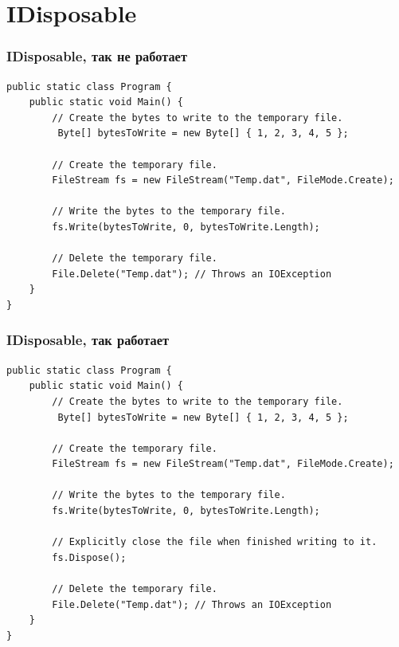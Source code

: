 \documentclass[xetex,mathserif,serif]{beamer}
\begin{document}
    \section{IDisposable}

    \begin{frame}[fragile]
        \frametitle{IDisposable, так не работает}
        \begin{scriptsize}
            \begin{verbatim}
public static class Program {
    public static void Main() {
        // Create the bytes to write to the temporary file.
         Byte[] bytesToWrite = new Byte[] { 1, 2, 3, 4, 5 };

        // Create the temporary file.
        FileStream fs = new FileStream("Temp.dat", FileMode.Create);

        // Write the bytes to the temporary file.
        fs.Write(bytesToWrite, 0, bytesToWrite.Length);

        // Delete the temporary file.
        File.Delete("Temp.dat"); // Throws an IOException
    }
}
            \end{verbatim}
        \end{scriptsize}
    \end{frame}

    \begin{frame}[fragile]
        \frametitle{IDisposable, так работает}
        \begin{scriptsize}
            \begin{verbatim}
public static class Program {
    public static void Main() {
        // Create the bytes to write to the temporary file.
         Byte[] bytesToWrite = new Byte[] { 1, 2, 3, 4, 5 };

        // Create the temporary file.
        FileStream fs = new FileStream("Temp.dat", FileMode.Create);

        // Write the bytes to the temporary file.
        fs.Write(bytesToWrite, 0, bytesToWrite.Length);

        // Explicitly close the file when finished writing to it.
        fs.Dispose();

        // Delete the temporary file.
        File.Delete("Temp.dat"); // Throws an IOException
    }
}
            \end{verbatim}
        \end{scriptsize}
    \end{frame}
\end{document}
